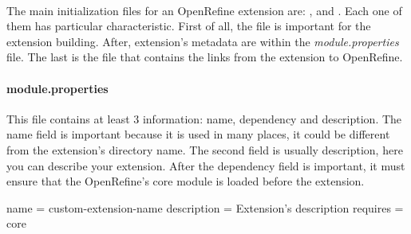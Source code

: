 \paragraph{} The main initialization files for an OpenRefine extension are: ,  and . Each one of them has particular characteristic. First of all, the  file is important for the extension building. After, extension's metadata are within the \textsl{module.properties} file. The last is the  file that contains the links from the extension to OpenRefine.

\paragraph{module.properties} This file contains at least 3 information: name, dependency and description. The name field is important because it is used in many places, it could be different from the extension's directory name. The second field is usually description, here you can describe your extension. After the dependency field is important, it must ensure that the OpenRefine's core module is loaded before the extension.
\begin{code}
name = custom-extension-name
description = Extension's description
requires = core
\end{code}

